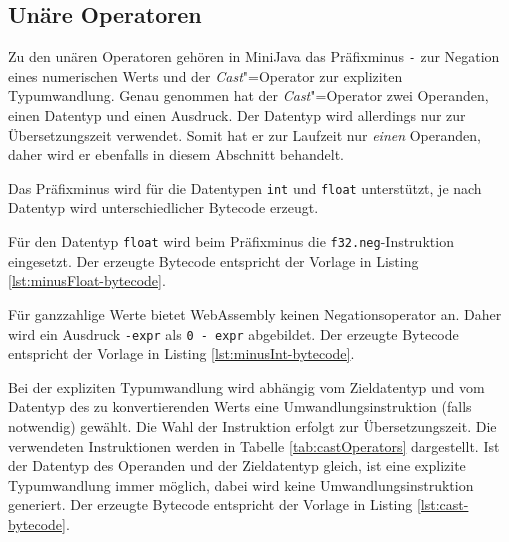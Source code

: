 

\subsection{Unäre Operatoren}
Zu den unären Operatoren gehören in MiniJava das Präfixminus \lstinline{-} zur Negation eines numerischen Werts und der \emph{Cast}"=Operator zur expliziten Typumwandlung. Genau genommen hat der \emph{Cast}"=Operator zwei Operanden, einen Datentyp und einen Ausdruck. Der Datentyp wird allerdings nur zur Übersetzungszeit verwendet. Somit hat er zur Laufzeit nur \emph{einen} Operanden, daher wird er ebenfalls in diesem Abschnitt behandelt.

Das Präfixminus wird für die Datentypen \lstinline{int} und \lstinline{float} unterstützt, je nach Datentyp wird unterschiedlicher Bytecode erzeugt.

Für den Datentyp \lstinline{float} wird beim Präfixminus die \lstinline{f32.neg}-Instruktion eingesetzt. Der erzeugte Bytecode entspricht der Vorlage in Listing \ref{lst:minusFloat-bytecode}.



Für ganzzahlige Werte bietet WebAssembly keinen Negationsoperator an. Daher wird ein Ausdruck \lstinline{-expr} als \lstinline{0 - expr} abgebildet. Der erzeugte Bytecode entspricht der Vorlage in Listing \ref{lst:minusInt-bytecode}.



Bei der expliziten Typumwandlung wird abhängig vom Zieldatentyp und vom Datentyp des zu konvertierenden Werts eine Umwandlungsinstruktion (falls notwendig) gewählt. Die Wahl der Instruktion erfolgt zur Übersetzungszeit. Die verwendeten Instruktionen werden in Tabelle \ref{tab:castOperators} dargestellt. Ist der Datentyp des Operanden und der Zieldatentyp gleich, ist eine explizite Typumwandlung immer möglich, dabei wird keine Umwandlungsinstruktion generiert. Der erzeugte Bytecode entspricht der Vorlage in Listing \ref{lst:cast-bytecode}.


